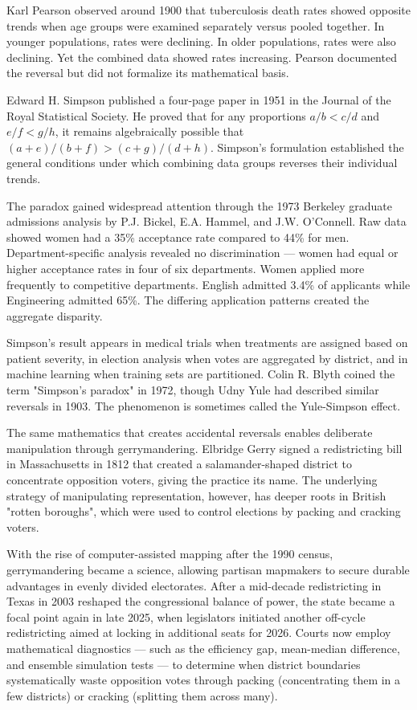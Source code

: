 \begin{historical}
Karl Pearson observed around 1900 that tuberculosis death rates showed opposite trends when age groups were examined separately versus pooled together. In younger populations, rates were declining. In older populations, rates were also declining. Yet the combined data showed rates increasing. Pearson documented the reversal but did not formalize its mathematical basis.

Edward H. Simpson published a four-page paper in 1951 in the Journal of the Royal Statistical Society. He proved that for any proportions $a/b < c/d$ and $e/f < g/h$, it remains algebraically possible that $(a+e)/(b+f) > (c+g)/(d+h)$. Simpson's formulation established the general conditions under which combining data groups reverses their individual trends.

The paradox gained widespread attention through the 1973 Berkeley graduate admissions analysis by P.J. Bickel, E.A. Hammel, and J.W. O'Connell. Raw data showed women had a 35\% acceptance rate compared to 44\% for men. Department-specific analysis revealed no discrimination — women had equal or higher acceptance rates in four of six departments. Women applied more frequently to competitive departments. English admitted 3.4\% of applicants while Engineering admitted 65\%. The differing application patterns created the aggregate disparity.

Simpson's result appears in medical trials when treatments are assigned based on patient severity, in election analysis when votes are aggregated by district, and in machine learning when training sets are partitioned. Colin R. Blyth coined the term "Simpson's paradox" in 1972, though Udny Yule had described similar reversals in 1903. The phenomenon is sometimes called the Yule-Simpson effect.

The same mathematics that creates accidental reversals enables deliberate manipulation through gerrymandering. Elbridge Gerry signed a redistricting bill in Massachusetts in 1812 that created a salamander-shaped district to concentrate opposition voters, giving the practice its name. The underlying strategy of manipulating representation, however, has deeper roots in British "rotten boroughs", which were used to control elections by packing and cracking voters.

With the rise of computer-assisted mapping after the 1990 census, gerrymandering became a science, allowing partisan mapmakers to secure durable advantages in evenly divided electorates. After a mid-decade redistricting in Texas in 2003 reshaped the congressional balance of power, the state became a focal point again in late 2025, when legislators initiated another off-cycle redistricting aimed at locking in additional seats for 2026. Courts now employ mathematical diagnostics — such as the efficiency gap, mean-median difference, and ensemble simulation tests — to determine when district boundaries systematically waste opposition votes through packing (concentrating them in a few districts) or cracking (splitting them across many). 
\end{historical}
